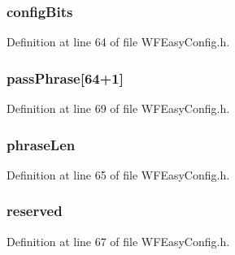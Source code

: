 \subsubsection[{config\+Bits}]{ config\+Bits}\label{structt_w_f_psk_calc_req_ac647026e8a19db5066c293ed43dce082}


Definition at line 64 of file W\+F\+Easy\+Config.\+h.

\hypertarget{structt_w_f_psk_calc_req_a0409b2624b6a452364ada6c1f9cf8185}{}
\subsubsection[{pass\+Phrase}]{ pass\+Phrase\mbox{[}64+1\mbox{]}}\label{structt_w_f_psk_calc_req_a0409b2624b6a452364ada6c1f9cf8185}


Definition at line 69 of file W\+F\+Easy\+Config.\+h.

\hypertarget{structt_w_f_psk_calc_req_ad3b8bff638ea0b505e7236bf04c79f25}{}
\subsubsection[{phrase\+Len}]{ phrase\+Len}\label{structt_w_f_psk_calc_req_ad3b8bff638ea0b505e7236bf04c79f25}


Definition at line 65 of file W\+F\+Easy\+Config.\+h.

\hypertarget{structt_w_f_psk_calc_req_a61b1cfce69fc0011cd7b07b127a3f3f6}{}
\subsubsection[{reserved}]{ reserved}\label{structt_w_f_psk_calc_req_a61b1cfce69fc0011cd7b07b127a3f3f6}


Definition at line 67 of file W\+F\+Easy\+Config.\+h.

\hypertarget{structt_w_f_psk_calc_req_ac951c37257280e8e3ce11cea1f115d4a}{}
